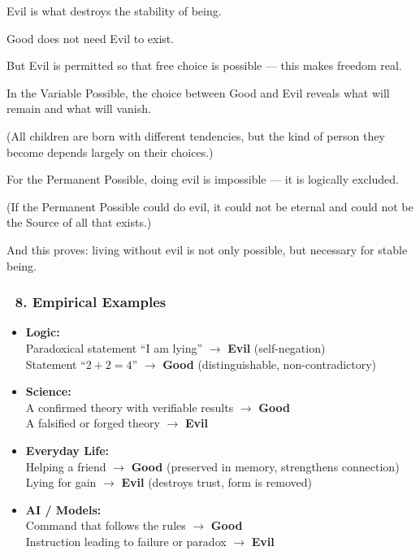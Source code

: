 \documentclass[12pt]{article}
\begin{document}
Evil is what destroys the stability of being.

Good does not need Evil to exist.

But Evil is permitted so that free choice is possible — this makes freedom real.

In the Variable Possible, the choice between Good and Evil reveals what will remain and what will vanish.

(All children are born with different tendencies, but the kind of person they become depends largely on their choices.)

For the Permanent Possible, doing evil is impossible — it is logically excluded.

(If the Permanent Possible could do evil, it could not be eternal and could not be the Source of all that exists.)

And this proves: living without evil is not only possible, but necessary for stable being.

\subsubsection*{🔹 8. Empirical Examples}

\begin{itemize}
\item \textbf{Logic:}\\
Paradoxical statement ``I am lying'' $\rightarrow$ \textbf{Evil} (self-negation)\\
Statement ``$2+2=4$'' $\rightarrow$ \textbf{Good} (distinguishable, non-contradictory)

\item \textbf{Science:}\\
A confirmed theory with verifiable results $\rightarrow$ \textbf{Good}\\
A falsified or forged theory $\rightarrow$ \textbf{Evil}

\item \textbf{Everyday Life:}\\
Helping a friend $\rightarrow$ \textbf{Good} (preserved in memory, strengthens connection)\\
Lying for gain $\rightarrow$ \textbf{Evil} (destroys trust, form is removed)

\item \textbf{AI / Models:}\\
Command that follows the rules $\rightarrow$ \textbf{Good}\\
Instruction leading to failure or paradox $\rightarrow$ \textbf{Evil}
\end{itemize}
\end{document}
